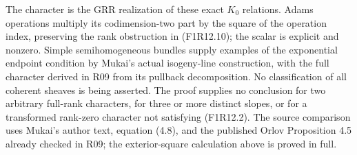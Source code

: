 The character is the GRR realization of these exact $K_0$
relations. Adams operations multiply its codimension-two
part by the square of the operation index, preserving the
rank obstruction in (F1R12.10); the scalar is explicit and
nonzero. Simple semihomogeneous bundles supply examples of
the exponential endpoint condition by Mukai's actual
isogeny-line construction, with the full character derived
in R09 from its pullback decomposition. No classification of
all coherent sheaves is being asserted. The proof supplies
no conclusion for two arbitrary full-rank characters, for
three or more distinct slopes, or for a transformed
rank-zero character not satisfying (F1R12.2). The source
comparison uses Mukai's author text, equation (4.8), and
the published Orlov Proposition 4.5 already checked in R09;
the exterior-square calculation above is proved in full.
